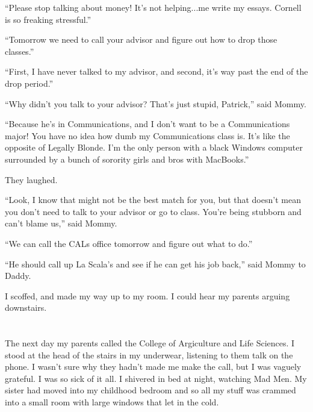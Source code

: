 ``Please stop talking about money!  It's not helping...me write my essays.
Cornell is so freaking stressful.''

``Tomorrow we need to call your advisor and figure out how to drop those
classes.''

``First, I have never talked to my advisor, and second, it's way past the end of
the drop period.''

``Why didn't you talk to your advisor?  That's just stupid, Patrick,'' said Mommy.

``Because he's in Communications, and I don't want to be a Communications major!
You have no idea how dumb my Communications class is.  It's like the opposite of
Legally Blonde.  I'm the only person with a black Windows computer surrounded by
a bunch of sorority girls and bros with MacBooks.''

They laughed.

``Look, I know that might not be the best match for you, but that doesn't mean
you don't need to talk to your advisor or go to class.  You're being stubborn
and can't blame us,'' said Mommy.

``We can call the CALs office tomorrow and figure out what to do.''

``He should call up La Scala's and see if he can get his job back,'' said Mommy to
Daddy.

I scoffed, and made my way up to my room.  I could hear my parents arguing
downstairs.

\section{}

The next day my parents called the College of Argiculture and Life Sciences.  I
stood at the head of the stairs in my underwear, listening to them talk on the
phone.  I wasn't sure why they hadn't made me make the call, but I was vaguely
grateful.  I was so sick of it all.  I shivered in bed at night, watching Mad
Men.  My sister had moved into my childhood bedroom and so all my stuff was
crammed into a small room with large windows that let in the cold.  
